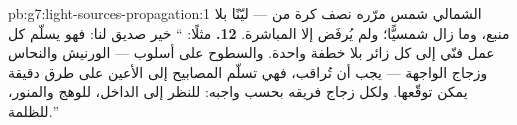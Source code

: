\begin{solution}{pb:g7:light-sources-propagation:1}
الشمالي  شمس مرّره نصف كرة من  --- ليّنًا بلا منبع،
وما زال شمسيًّا؛ ولم يُرفَض إلا  المباشرة.
\textbf{12.} مثلًا: `` خير صديق لنا: فهو يسلّم كل عمل
فنّي إلى كل زائر بلا خطفة واحدة. والسطوح على أسلوب  ---
الورنيش والنحاس وزجاج الواجهة --- يجب أن تُراقب، فهي تسلّم
المصابيح إلى الأعين على طرق دقيقة يمكن توقّعها. ولكل زجاج
فريقه بحسب واجبه:  للنظر إلى الداخل، 
للوهج والمنور،  للظلمة.''
\end{solution}
